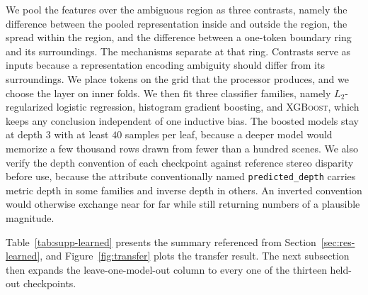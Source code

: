 \documentclass{article} %
\theoremstyle{defstyle}
\theoremstyle{plain}
\begin{document}
We pool the features over the ambiguous region as three contrasts, namely the difference
between the pooled representation inside and outside the region, the spread within the region,
and the difference between a one-token boundary ring and its surroundings. The mechanisms
separate at that ring. Contrasts serve as inputs because a representation encoding ambiguity
should differ from its surroundings. We place tokens on the grid that the processor produces,
and we choose the layer on inner folds. We then fit three classifier families, namely
$L_2$-regularized logistic regression, histogram gradient boosting, and \textsc{XGBoost}, which
keeps any conclusion independent of one inductive bias. The boosted models stay at depth $3$
with at least $40$ samples per leaf, because a deeper model would memorize a few thousand rows
drawn from fewer than a hundred scenes. We also verify the depth convention of each checkpoint
against reference stereo disparity before use, because the attribute conventionally named
\texttt{predicted\_depth} carries metric depth in some families and inverse depth in others. An
inverted convention would otherwise exchange near for far while still returning numbers of a
plausible magnitude.

Table~\ref{tab:supp-learned} presents the summary referenced from
Section~\ref{sec:res-learned}, and Figure~\ref{fig:transfer} plots the transfer result. The
next subsection then expands the leave-one-model-out column to every one of the thirteen
held-out checkpoints.
\end{document}
